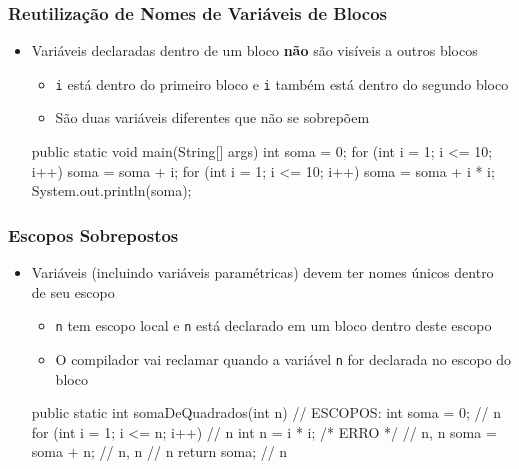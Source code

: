 \documentclass[xcolor={dvipsnames,table},aspectratio=169]{beamer}
\begin{document}
\begin{frame}[fragile]\frametitle{Reutilização de Nomes de Variáveis de Blocos}
\begin{itemize}
	\item Variáveis declaradas dentro de um bloco \textbf{não} são visíveis a outros blocos
	\begin{itemize}
		\item \texttt{i} está dentro do primeiro bloco e \texttt{i} também está dentro do segundo bloco
		\item São duas variáveis diferentes que não se sobrepõem
	\end{itemize}
\begin{javacode}
public static void main(String[] args) {
  int soma = 0;
  for (int i = 1; i <= 10; i++) {
    soma = soma + i;
  }
  for (int i = 1; i <= 10; i++) {
    soma = soma + i * i;
  }
  System.out.println(soma);
}
\end{javacode}
\end{itemize}
\end{frame}

\begin{frame}[fragile]\frametitle{Escopos Sobrepostos}
\begin{itemize}
	\item Variáveis (incluindo variáveis paramétricas) devem ter nomes únicos dentro de seu escopo
	\begin{itemize}
		\item \texttt{n} tem escopo local e \texttt{n} está declarado em um bloco dentro deste escopo
		\item O compilador vai reclamar quando a variável \texttt{n} for declarada no escopo do bloco
	\end{itemize}
\begin{javacode}
public static int somaDeQuadrados(int n) { // ESCOPOS:
  int soma = 0;                            // n
  for (int i = 1; i <= n; i++) {           // n
    int n = i * i; /* ERRO */              // n, n
    soma = soma + n;                       // n, n
  }                                        // n
  return soma;                             // n
}
\end{javacode}
\end{itemize}
\end{frame}
\end{document}
